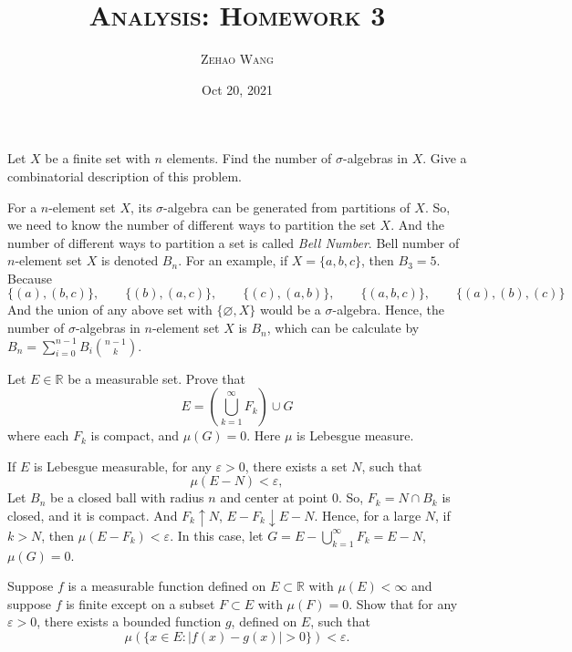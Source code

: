 \documentclass[12pt]{article}
\title{\textsc{Analysis: Homework 3}}
\author{\textsc{Zehao Wang}}
\date{Oct 20, 2021}
\newenvironment{exercise}[1]{\begin{tcolorbox}[colback=black!15, colframe=black!80, breakable, title=#1]}{\end{tcolorbox}}
\newenvironment{proof}{\begin{tcolorbox}[colback=white, colframe=black!50, breakable, title=Proof. ]\setlength{\parskip}{0.8em}}{\,\\\rightline{$\square$}\end{tcolorbox}}
\newenvironment{solution}{\begin{tcolorbox}[colback=white, colframe=black!50, breakable, title=Solution. ]\setlength{\parskip}{0.8em}}{\end{tcolorbox}}
\begin{document}
    \maketitle

    \begin{exercise}{1}
        Let $X$ be a finite set with $n$ elements. Find the number of $\sigma$-algebras in $X$. Give a combinatorial description of this problem. 
    \end{exercise}

    \begin{solution}
        For a $n$-element set $X$, its $\sigma$-algebra can be generated from partitions of $X$. So, we need to know the number of different ways to partition the set $X$. And the number of different ways to partition a set is called \emph{Bell Number}. Bell number of $n$-element set $X$ is denoted $B_n$. For an example, if $X=\{a,b,c\}$, then $B_3=5$. Because
        \[\{(a), (b,c)\},\qquad\{(b), (a,c)\},\qquad\{(c), (a,b)\}, \qquad\{(a,b,c)\},\qquad\{(a), (b), (c)\}\]
        And the union of any above set with $\{\varnothing, X\}$ would be a $\sigma$-algebra. 
        Hence, the number of $\sigma$-algebras in $n$-element set $X$ is $B_n$, which can be calculate by $B_n=\sum_{i=0}^{n-1}B_i\binom{n-1}{k}$. 
    \end{solution}

    \begin{exercise}{2}
        Let $E\in\mathbb{R}$ be a measurable set. Prove that 
        \[E=\left(\bigcup_{k=1}^\infty F_k\right)\cup G\]
        where each $F_k$ is compact, and $\mu(G)=0$. Here $\mu$ is Lebesgue measure. 
    \end{exercise}

    \begin{proof}
        If $E$ is Lebesgue measurable, for any $\varepsilon>0$, there exists a set $N$, such that
        \[
            \mu(E-N)<\varepsilon, 
        \]
        Let $B_n$ be a closed ball with radius $n$ and center at point $0$. So, $F_k=N\cap B_k$ is closed, and it is compact. And $F_k\uparrow N$, $E-F_k\downarrow E-N$. Hence, for a large $N$, if $k>N$, then $\mu(E-F_k)<\varepsilon$. In this case, let $G=E-\bigcup_{k=1}^\infty F_k=E-N$, $\mu(G)=0$. 
    \end{proof}

    \begin{exercise}{3}
        Suppose $f$ is a measurable function defined on $E\subset\mathbb{R}$ with $\mu(E) < \infty$ and suppose $f$ is finite except on a subset $F \subset E$ with $\mu(F) = 0$. Show that for any $\varepsilon > 0$, there exists a bounded function $g$, defined on $E$, such that
        \[
            \mu(\{x\in E:|f(x)-g(x)|>0\})<\varepsilon. 
        \]
    \end{exercise}
\end{document}
